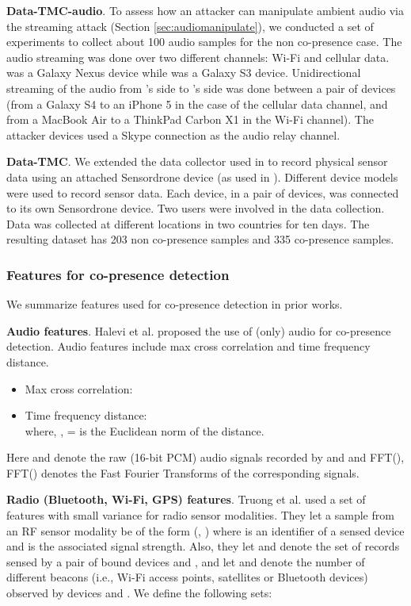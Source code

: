 {\textbf{Data-TMC-audio}. To assess how an attacker can manipulate ambient audio via the
streaming attack (Section \ref{sec:audiomanipulate}), we conducted a
set of experiments to collect about 100 audio samples for the non
co-presence case. The audio streaming was done over two different channels:
Wi-Fi and cellular data. \prover was a Galaxy Nexus device while
\verifier was a Galaxy S3 device. Unidirectional streaming of the audio from
\prover's side to \verifier's side was done between a pair of devices (from
a Galaxy S4 to an iPhone 5 in the case of the cellular data channel,
and from a MacBook Air to a ThinkPad Carbon X1 in the Wi-Fi
channel). The attacker devices used a Skype connection as the audio
relay channel.

\textbf{Data-TMC}. We extended the data collector used in \cite{TruongPerCom14} to record physical
sensor data using an attached Sensordrone device (as used in
\cite{ShresthaFC2014}). Different device models were used to record sensor
data. Each device, in a pair of devices, was connected to its own Sensordrone
device. Two users were involved in the data collection. Data was collected at
different locations in two countries for ten days. The resulting dataset has
203 non co-presence samples and 335 co-presence samples.






\subsubsection{Features for co-presence detection}
We summarize features used for co-presence detection in prior works.

\textbf{Audio features}. Halevi et al. \cite{DBLP:conf/esorics/HaleviMSX12} proposed the use of (only) audio
for co-presence detection. Audio features include max cross correlation and time frequency distance.

\begin{itemize}
\item Max cross correlation: \\ 
\item Time frequency distance: \\ 
where, ,  =
 is the Euclidean norm of the distance.
\end{itemize}
Here  and  denote the raw (16-bit PCM) audio signals recorded by  and  and FFT(),
FFT() denotes the Fast Fourier Transforms of the corresponding signals.

\textbf{Radio (Bluetooth, Wi-Fi, GPS) features}. Truong et al. \cite{TruongPerCom14} used a set of features with small variance for radio sensor modalities. 
They let a sample from an RF sensor modality be of
the form (, ) where  is an identifier of a sensed device and
 is the associated signal strength.  Also, they let  and  denote the
set of records sensed by a pair of bound devices  and , and let
 and  denote the number of different beacons (i.e., Wi-Fi
access points, satellites or Bluetooth devices) observed by devices
 and . We define the following sets:

}

